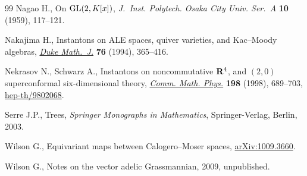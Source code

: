 \documentclass[pdftex]{sigma}
\begin{document}
\begin{thebibliography}{99}
Nagao H., On {${\rm GL}(2,K[x])$}, \textit{J.~Inst. Polytech. Osaka City
  Univ. Ser.~A} \textbf{10} (1959), 117--121.

Nakajima H., Instantons on {ALE} spaces, quiver varieties, and {K}ac--{M}oody
  algebras, \href{http://dx.doi.org/10.1215/S0012-7094-94-07613-8}{\textit{Duke Math.~J.}} \textbf{76} (1994), 365--416.

Nekrasov N., Schwarz A., Instantons on noncommutative {${\bf R}^4$}, and
  {$(2,0)$} superconformal six-dimensional theory, \href{http://dx.doi.org/10.1007/s002200050490}{\textit{Comm. Math. Phys.}}
  \textbf{198} (1998), 689--703, \href{http://arxiv.org/abs/hep-th/9802068}{hep-th/9802068}.

Serre J.P., Trees, \textit{Springer Monographs in Mathematics}, Springer-Verlag, Berlin,
  2003.

Wilson G., Equivariant maps between {C}alogero--{M}oser spaces,
  \href{http://arxiv.org/abs/1009.3660}{arXiv:1009.3660}.

Wilson G., Notes on the vector adelic {G}rassmannian, 2009, unpublished.

\end{thebibliography}\LastPageEnding
\end{document}
